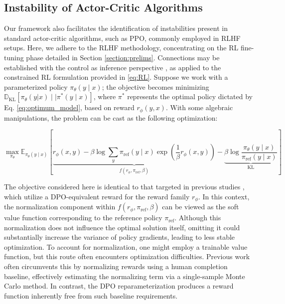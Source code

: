 \subsection{Instability of Actor-Critic Algorithms} Our framework also facilitates the identification of instabilities present in standard actor-critic algorithms, such as PPO, commonly employed in RLHF setups. Here, we adhere to the RLHF methodology, concentrating on the RL fine-tuning phase detailed in Section \ref{section:prelims}. Connections may be established with the control as inference perspective \cite{levine2018reinforcement}, as applied to the constrained RL formulation provided in \ref{eq:RL}. Suppose we work with a parameterized policy $\pi_{\theta}(y\mid x)$; the objective becomes minimizing $\mathbb{D}_{\text{KL}}[\pi_{\theta}(y|x) \mid \mid \pi^*(y\mid x)]$, where $\pi^*$ represents the optimal policy dictated by Eq. \ref{eq:optimum_model}, based on reward $r_{\phi}(y, x)$. With some algebraic manipulations, the problem can be cast as the following optimization:

\begin{equation}\label{eq:AC}
    \max_{\pi_{\theta}}\mathbb{E}_{\pi_{\theta}(y\mid x)}\left[\underbrace{r_{\phi}(x, y) -\beta\log\sum_{y}\pi_\text{ref}(y\mid x)\exp\left(\frac{1}{\beta}r_{\phi}(x, y)\right)}_{f(r_{\phi}, \pi_\text{ref}, \beta)} - \underbrace{\beta\log\frac{\pi_{\theta}(y\mid x)}{\pi_\text{ref}(y\mid x)}}_{\text{KL}}\right]
\end{equation}

The objective considered here is identical to that targeted in previous studies 
\citep{ziegler2020finetuning, stiennon2022learning, bai2022training, ouyang2022training}, which utilize a DPO-equivalent reward for the reward family $r_{\phi}$. In this context, the normalization component within $f(r_{\phi}, \pi_\text{ref}, \beta)$ can be viewed as the soft value function corresponding to the reference policy $\pi_\text{ref}$. Although this normalization does not influence the optimal solution itself, omitting it could substantially increase the variance of policy gradients, leading to less stable optimization. To account for normalization, one might employ a trainable value function, but this route often encounters optimization difficulties. Previous work often circumvents this by normalizing rewards using a human completion baseline, effectively estimating the normalizing term via a single-sample Monte Carlo method. In contrast, the DPO reparameterization produces a reward function inherently free from such baseline requirements.

